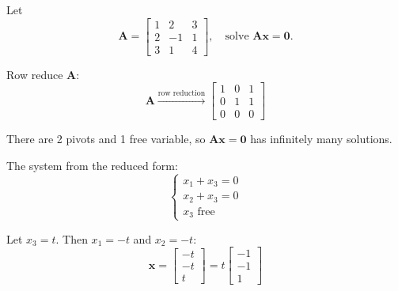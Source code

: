 \begin{example}
  Let
  \[
    \mathbf{A}
    =
    \begin{bmatrix}
      1 & 2 & 3 \\ 2 & -1 & 1 \\ 3 & 1 & 4
    \end{bmatrix}
    ,
    \quad \text{solve } \mathbf{A}\mathbf{x} = \mathbf{0}.
  \]

  Row reduce $\mathbf{A}$:
  \[
    \mathbf{A}
    \xrightarrow{\text{row reduction}}
    \begin{bmatrix}
      1 & 0 & 1 \\ 0 & 1 & 1 \\ 0 & 0 & 0
    \end{bmatrix}
  \]

  There are 2 pivots and 1 free variable, so $\mathbf{A}\mathbf{x} = \mathbf{0}$ has infinitely many solutions.

  The system from the reduced form:
  \[
    \begin{cases}
      x_1 + x_3 = 0 \\
      x_2 + x_3 = 0 \\
      x_3 \text{ free}
    \end{cases}
  \]

  Let $x_3 = t$. Then $x_1 = -t$ and $x_2 = -t$:
  \[
    \mathbf{x}
    =
    \begin{bmatrix}
      -t \\ -t \\ t
    \end{bmatrix}
    = t
    \begin{bmatrix}
      -1 \\ -1 \\ 1
    \end{bmatrix}
  \]
\end{example}


